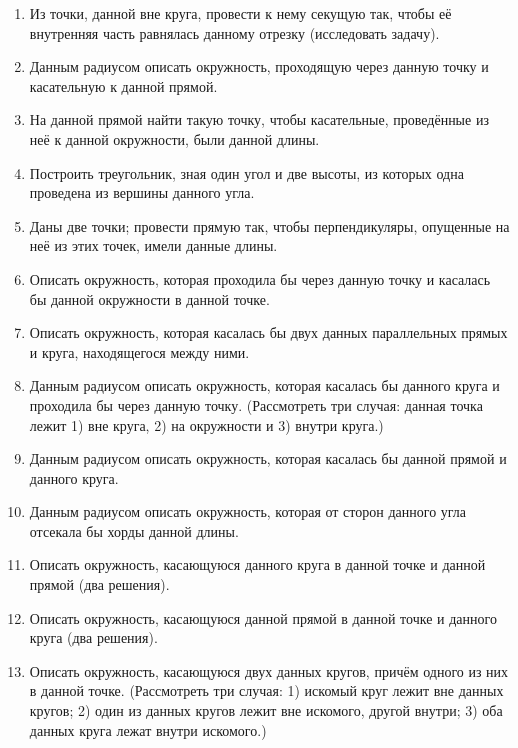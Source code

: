 \documentclass[oneside]{book}
\begin{document}
\begin{enumerate}[resume]
 \item
Из точки, данной вне круга, провести к нему секущую так, чтобы её внутренняя часть равнялась данному отрезку (исследовать задачу).

 \item
Данным радиусом описать окружность, проходящую через данную точку и касательную к данной прямой.

 \item
На данной прямой найти такую точку, чтобы касательные, проведённые из неё к данной окружности, были данной длины.

 \item
Построить треугольник, зная один угол и две высоты, из которых одна проведена из вершины данного угла.

 \item
Даны две точки;
провести прямую так, чтобы перпендикуляры, опущенные на неё из этих точек, имели данные длины.

 \item
Описать окружность, которая проходила бы через данную точку и касалась бы данной окружности в данной точке.

 \item
Описать окружность, которая касалась бы двух данных параллельных прямых и круга, находящегося между ними.

 \item
Данным радиусом описать окружность, которая касалась бы данного круга и проходила бы через данную точку.
(Рассмотреть три случая:
данная точка лежит 
1) вне круга, 
2) на окружности 
и 3) внутри круга.)

 \item
Данным радиусом описать окружность, которая касалась бы данной прямой и данного круга.

 \item
Данным радиусом описать окружность, которая от сторон данного угла отсекала бы хорды данной длины.

 \item
Описать окружность, касающуюся данного круга в данной точке и данной прямой (два решения).

 \item
Описать окружность, касающуюся данной прямой в данной точке и данного круга (два решения).

 \item
Описать окружность, касающуюся двух данных кругов, причём одного из них в данной точке.
(Рассмотреть три случая:
1) искомый круг лежит вне данных кругов;
2) один из данных кругов лежит вне искомого, другой внутри;
3) оба данных круга лежат внутри искомого.)


\end{enumerate}
\end{document}
